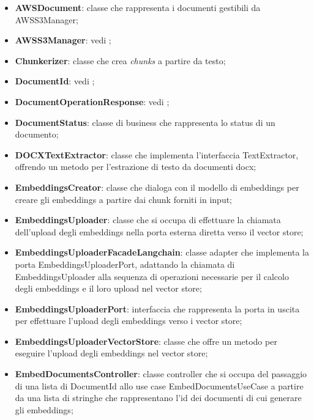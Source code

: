 \documentclass[10pt, a4paper]{article}
\begin{document}
\begin{itemize}
    \item \label{AWSDocument}\textbf{AWSDocument}: classe che rappresenta i documenti gestibili da AWSS3Manager;
    \item \textbf{AWSS3Manager}: vedi ;
    \item \label{Chunkerizer}\textbf{Chunkerizer}: classe che crea \textit{chunks\pg} a partire da testo;
    \item \textbf{DocumentId}: vedi ;
    \item \textbf{DocumentOperationResponse}: vedi ;
    \item \label{DocumentStatus} \textbf{DocumentStatus}: classe di business che rappresenta lo status di un documento;
    \item \label{DOCXTextExtractor}\textbf{DOCXTextExtractor}: classe che implementa l'interfaccia TextExtractor, offrendo un metodo per l'estrazione di testo da documenti docx;
    \item  \label{EmbeddingsCreator}\textbf{EmbeddingsCreator}: classe che dialoga con il modello di embeddings per creare gli embeddings a partire dai chunk forniti in input;
    \item \label{EmbeddingsUploader}\textbf{EmbeddingsUploader}: classe che si occupa di effettuare la chiamata dell'upload degli embeddings nella porta esterna diretta verso il vector store;
    \item \label{EmbeddingsUploaderFacadeLangchain}\textbf{EmbeddingsUploaderFacadeLangchain}: classe adapter che implementa la porta EmbeddingsUploaderPort, adattando la chiamata di EmbeddingsUploader alla sequenza di operazioni necessarie per il calcolo degli embeddings e il loro upload nel vector store;
    \item \label{EmbeddingsUploaderPort}\textbf{EmbeddingsUploaderPort}: interfaccia che rappresenta la porta in uscita per effettuare l'upload degli embeddings verso i vector store;
    \item \label{EmbeddingsUploaderVectorStore}\textbf{EmbeddingsUploaderVectorStore}: classe che offre un metodo per eseguire l'upload degli embeddings nel vector store;
    \item \label{EmbedDocumentsController}\textbf{EmbedDocumentsController}: classe controller che si occupa del passaggio di una lista di DocumentId allo use case EmbedDocumentsUseCase a partire da una lista di stringhe che rappresentano l'id dei documenti di cui generare gli embeddings;

\end{itemize}
\end{document}
